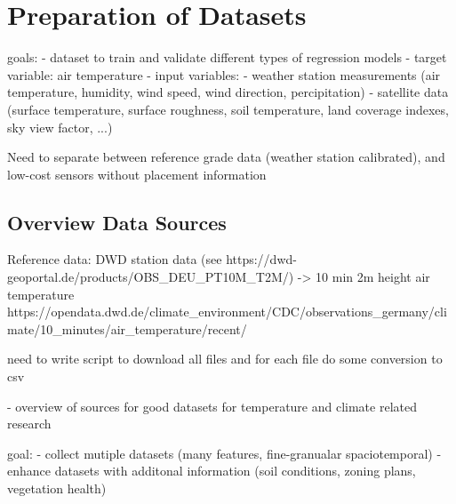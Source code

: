 \chapter{Preparation of Datasets}
\label{chap:preparations data sets}

goals:
- dataset to train and validate different types of regression models
- target variable: air temperature
- input variables:
    - weather station measurements (air temperature, humidity, wind speed, wind direction, percipitation)
    - satellite data (surface temperature, surface roughness, soil temperature, land coverage indexes, sky view factor, ...)

    Need to separate between reference grade data (weather station calibrated), and low-cost sensors without placement information



\section{Overview Data Sources}
Reference data: DWD station data (see https://dwd-geoportal.de/products/OBS\_DEU\_PT10M\_T2M/) -> 10 min 2m height air temperature
https://opendata.dwd.de/climate\_environment/CDC/observations\_germany/climate/10\_minutes/air\_temperature/recent/

need to write script to download all files and for each file do some conversion to csv


- overview of sources for good datasets for temperature and climate related research

goal:
- collect mutiple datasets (many features, fine-granualar spaciotemporal)
- enhance datasets with additonal information (soil conditions, zoning plans, vegetation health)
